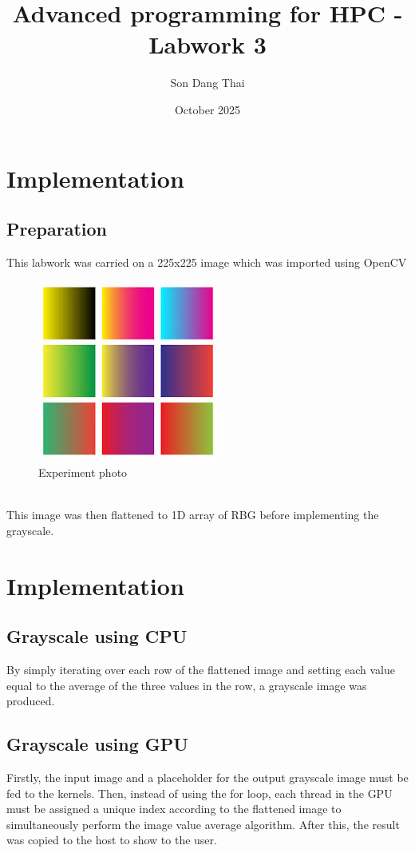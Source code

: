\documentclass{article}
\title{Advanced programming for HPC - Labwork 3}
\author{Son Dang Thai}
\date{October 2025}
\begin{document}
\maketitle

\section{Implementation}
\subsection{Preparation}
This labwork was carried on a 225x225 image which was imported using OpenCV
\begin{figure}[htbp]
    \centering
    \includegraphics{rgb.jpg}
    \caption{Experiment photo}
    \label{fig:placeholder}
\end{figure}
\\This image was then flattened to 1D array of RBG before implementing the grayscale.

\section{Implementation}
\subsection{Grayscale using CPU}
By simply iterating over each row of the flattened image and setting each value equal to the average of the three values in the row, a grayscale image was produced.

\subsection{Grayscale using GPU}
Firstly, the input image and a placeholder for the output grayscale image must be fed to the kernels. Then, instead of using the for loop, each thread in the GPU must be assigned a unique index according to the flattened image to simultaneously perform the image value average algorithm. After this, the result was copied to the host to show to the user. 
\end{document}
